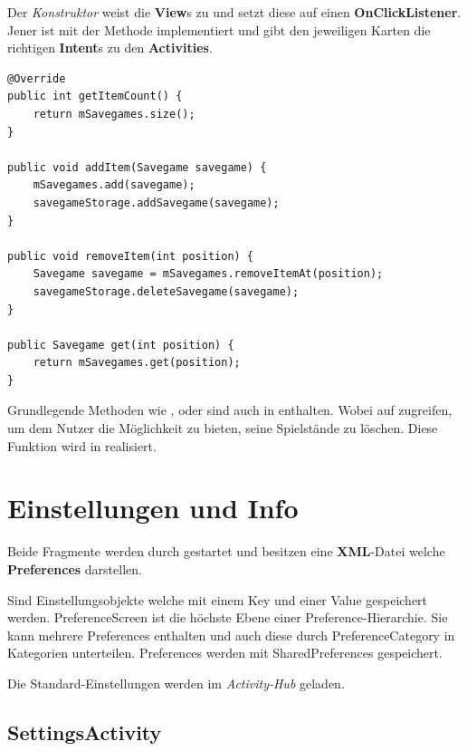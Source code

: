 Der \emph{Konstruktor} weist die \textbf{View}s zu und setzt diese auf einen
\textbf{OnClickListener}. Jener ist mit der Methode 
implementiert und gibt den jeweiligen Karten die richtigen \textbf{Intent}s zu
den \textbf{Activities}.\\

\begin{lstlisting}[caption={SavegameAdapter Grundlegende Methoden},captionpos=b]
@Override
public int getItemCount() {
	return mSavegames.size();
}

public void addItem(Savegame savegame) {
	mSavegames.add(savegame);
	savegameStorage.addSavegame(savegame);
}

public void removeItem(int position) {
	Savegame savegame = mSavegames.removeItemAt(position);
	savegameStorage.deleteSavegame(savegame);
}

public Savegame get(int position) {
	return mSavegames.get(position);
}
\end{lstlisting}

Grundlegende Methoden wie ,
 oder  sind auch in
 enthalten. Wobei  auf
 zugreifen, um dem Nutzer die Möglichkeit zu bieten,
seine Spielstände zu löschen. Diese Funktion wird in 
realisiert.

\section{Einstellungen und Info}
\sectionauthor{\leonard}

Beide Fragmente werden durch  gestartet und besitzen eine
\textbf{XML}-Datei welche \textbf{Preferences} darstellen.

\begin{infobox}[frametitle=Preferences]
Sind Einstellungsobjekte welche mit einem Key und einer Value gespeichert
werden. PreferenceScreen ist die höchste Ebene einer Preference-Hierarchie. Sie
kann mehrere Preferences enthalten und auch diese durch PreferenceCategory in
Kategorien unterteilen. Preferences werden mit SharedPreferences gespeichert.
\end{infobox}

Die Standard-Einstellungen werden im \emph{Activity-Hub} geladen. 

\subsection{SettingsActivity}


